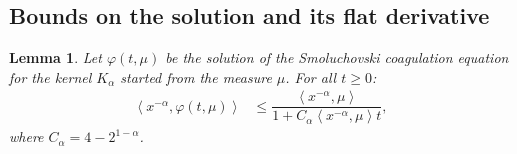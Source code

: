 \documentclass[11pt,a4paper]{article}
\newtheorem{lemma}[theorem]{Lemma}
\begin{document}
\subsection{Bounds on the solution and its flat derivative}


\begin{lemma}
    Let $\varphi\left(t,\mu \right)$ be the solution of the Smoluchovski coagulation equation for the kernel $K_\alpha$ started from the measure $\mu$. For all $t\geq 0$:
    \begin{align*}
        \left\langle x^{-\alpha}, \varphi\left(t,\mu\right) \right\rangle &\leq \dfrac{\left\langle x^{-\alpha}, \mu \right\rangle}{1 + C_\alpha\left\langle x^{-\alpha}, \mu \right\rangle t },
    \end{align*}
    where $C_\alpha = 4-2^{1-\alpha}$.
\end{lemma}
\end{document}
